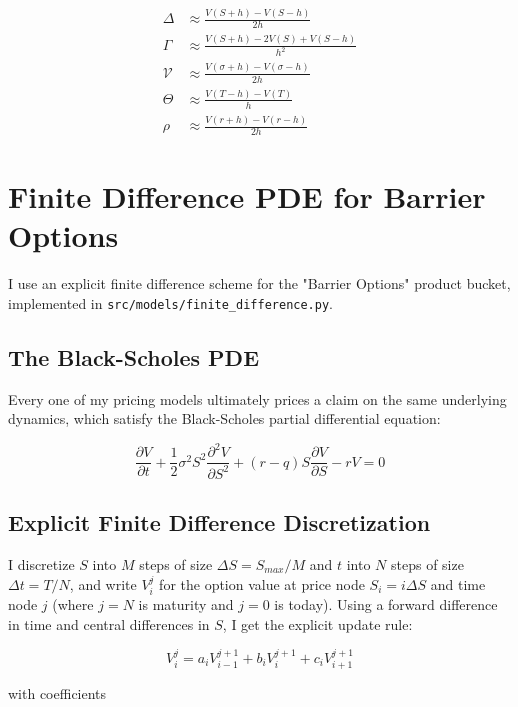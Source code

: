 \documentclass[12pt,a4paper]{article}
\begin{document}
\begin{align}
\Delta &\approx \frac{V(S+h) - V(S-h)}{2h} \\
\Gamma &\approx \frac{V(S+h) - 2V(S) + V(S-h)}{h^2} \\
\mathcal{V} &\approx \frac{V(\sigma+h) - V(\sigma-h)}{2h} \\
\Theta &\approx \frac{V(T-h) - V(T)}{h} \\
\rho &\approx \frac{V(r+h) - V(r-h)}{2h}
\end{align}

\section{Finite Difference PDE for Barrier Options}

I use an explicit finite difference scheme for the "Barrier Options"
product bucket, implemented in \texttt{src/models/finite\_difference.py}.

\subsection{The Black-Scholes PDE}

Every one of my pricing models ultimately prices a claim on the same
underlying dynamics, which satisfy the Black-Scholes partial differential
equation:

\begin{equation}
\frac{\partial V}{\partial t} + \frac{1}{2}\sigma^2 S^2 \frac{\partial^2 V}{\partial S^2} + (r-q)S\frac{\partial V}{\partial S} - rV = 0
\end{equation}

\subsection{Explicit Finite Difference Discretization}

I discretize $S$ into $M$ steps of size $\Delta S = S_{max}/M$ and $t$ into
$N$ steps of size $\Delta t = T/N$, and write $V_i^j$ for the option value
at price node $S_i = i\Delta S$ and time node $j$ (where $j=N$ is maturity
and $j=0$ is today). Using a forward difference in time and central
differences in $S$, I get the explicit update rule:

\begin{equation}
V_i^{j} = a_i V_{i-1}^{j+1} + b_i V_i^{j+1} + c_i V_{i+1}^{j+1}
\end{equation}

with coefficients
\end{document}
